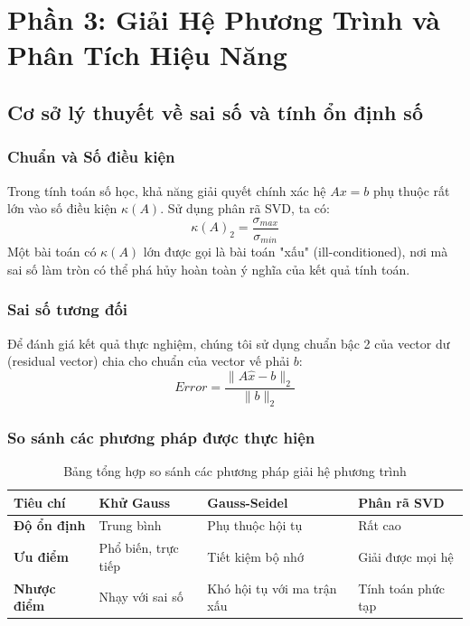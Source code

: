 \documentclass[a4paper]{article}
\begin{document}
\section{Phần 3: Giải Hệ Phương Trình và Phân Tích Hiệu Năng}
\subsection{Cơ sở lý thuyết về sai số và tính ổn định số}
\subsubsection{Chuẩn và Số điều kiện}
Trong tính toán số học, khả năng giải quyết chính xác hệ $Ax=b$ phụ thuộc rất lớn vào số điều kiện $\kappa(A)$. Sử dụng phân rã SVD, ta có:
\begin{equation}
\kappa(A)_2 = \frac{\sigma_{max}}{\sigma_{min}}
\end{equation}
Một bài toán có $\kappa(A)$ lớn được gọi là bài toán "xấu" (ill-conditioned), nơi mà sai số làm tròn có thể phá hủy hoàn toàn ý nghĩa của kết quả tính toán.

\subsubsection{Sai số tương đối}
Để đánh giá kết quả thực nghiệm, chúng tôi sử dụng chuẩn bậc 2 của vector dư (residual vector) chia cho chuẩn của vector vế phải $b$:
\begin{equation}
Error = \frac{\|A\hat{x} - b\|_2}{\|b\|_2}
\end{equation}

\subsubsection{So sánh các phương pháp được thực hiện}
\begin{table}[H]
\centering
\begin{tabular}{|>{\centering\arraybackslash}m{2.5cm}|>{\centering\arraybackslash}m{3cm}|>{\centering\arraybackslash}m{3cm}|>{\centering\arraybackslash}m{3.5cm}|}
\hline
\textbf{Tiêu chí} & \textbf{Khử Gauss} & \textbf{Gauss-Seidel} & \textbf{Phân rã SVD} \\ \hline
\textbf{Độ ổn định} & Trung bình & Phụ thuộc hội tụ & Rất cao \\ \hline
\textbf{Ưu điểm} & Phổ biến, trực tiếp & Tiết kiệm bộ nhớ & Giải được mọi hệ \\ \hline
\textbf{Nhược điểm} & Nhạy với sai số & Khó hội tụ với ma trận xấu & Tính toán phức tạp \\ \hline
\end{tabular}
\caption{Bảng tổng hợp so sánh các phương pháp giải hệ phương trình}
\end{table}
\end{document}
